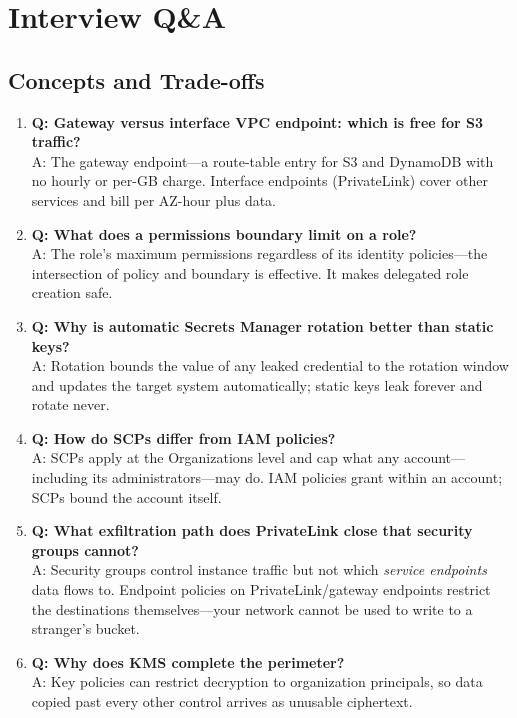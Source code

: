 \section{Interview Q\&A}
\subsection{Concepts and Trade-offs}
\begin{enumerate}
    \item \textbf{Q: Gateway versus interface VPC endpoint: which is free for S3 traffic?}\\
    A: The gateway endpoint---a route-table entry for S3 and DynamoDB with no hourly or per-GB charge. Interface endpoints (PrivateLink) cover other services and bill per AZ-hour plus data.
    \item \textbf{Q: What does a permissions boundary limit on a role?}\\
    A: The role's maximum permissions regardless of its identity policies---the intersection of policy and boundary is effective. It makes delegated role creation safe.
    \item \textbf{Q: Why is automatic Secrets Manager rotation better than static keys?}\\
    A: Rotation bounds the value of any leaked credential to the rotation window and updates the target system automatically; static keys leak forever and rotate never.
    \item \textbf{Q: How do SCPs differ from IAM policies?}\\
    A: SCPs apply at the Organizations level and cap what any account---including its administrators---may do. IAM policies grant within an account; SCPs bound the account itself.
    \item \textbf{Q: What exfiltration path does PrivateLink close that security groups cannot?}\\
    A: Security groups control instance traffic but not which \emph{service endpoints} data flows to. Endpoint policies on PrivateLink/gateway endpoints restrict the destinations themselves---your network cannot be used to write to a stranger's bucket.
    \item \textbf{Q: Why does KMS complete the perimeter?}\\
    A: Key policies can restrict decryption to organization principals, so data copied past every other control arrives as unusable ciphertext.
\end{enumerate}

